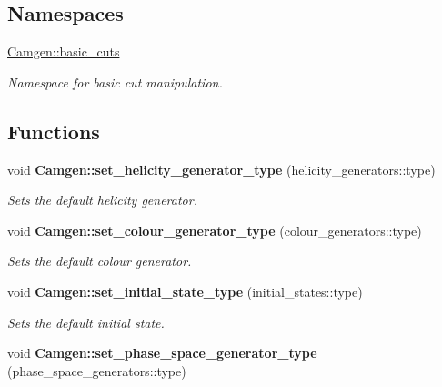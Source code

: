 \subsection*{Namespaces}
\begin{DoxyCompactItemize}
\item 
 \hyperlink{a00879}{Camgen\+::basic\+\_\+cuts}
\begin{DoxyCompactList}\small\item\em Namespace for basic cut manipulation. \end{DoxyCompactList}\end{DoxyCompactItemize}
\subsection*{Functions}
\begin{DoxyCompactItemize}
\item 
\hypertarget{a00878_ae0737b857faf74c1f584b8270b7d6caa}{}void {\bfseries Camgen\+::set\+\_\+helicity\+\_\+generator\+\_\+type} (helicity\+\_\+generators\+::type)\label{a00878_ae0737b857faf74c1f584b8270b7d6caa}

\begin{DoxyCompactList}\small\item\em Sets the default helicity generator. \end{DoxyCompactList}\item 
\hypertarget{a00878_a14d183e26f400cb7b704a22e5bd3e78e}{}void {\bfseries Camgen\+::set\+\_\+colour\+\_\+generator\+\_\+type} (colour\+\_\+generators\+::type)\label{a00878_a14d183e26f400cb7b704a22e5bd3e78e}

\begin{DoxyCompactList}\small\item\em Sets the default colour generator. \end{DoxyCompactList}\item 
\hypertarget{a00878_ae1e034c0571edf9f7449ac4dd38b269b}{}void {\bfseries Camgen\+::set\+\_\+initial\+\_\+state\+\_\+type} (initial\+\_\+states\+::type)\label{a00878_ae1e034c0571edf9f7449ac4dd38b269b}

\begin{DoxyCompactList}\small\item\em Sets the default initial state. \end{DoxyCompactList}\item 
\hypertarget{a00878_a57c652dae85dfcc87140fee575dda9ce}{}void {\bfseries Camgen\+::set\+\_\+phase\+\_\+space\+\_\+generator\+\_\+type} (phase\+\_\+space\+\_\+generators\+::type)\label{a00878_a57c652dae85dfcc87140fee575dda9ce}


\end{DoxyCompactItemize}
